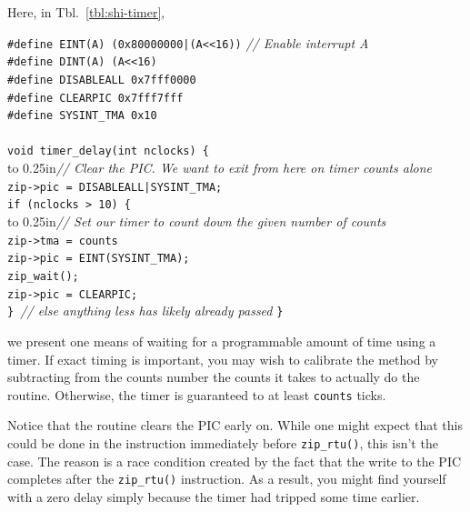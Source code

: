 \documentclass{gqtekspec}
\begin{document}
Here, in Tbl.~\ref{tbl:shi-timer},
\begin{table}\begin{center}
\begin{tabbing}
{\tt \#define EINT(A) (0x80000000|(A<<16))} \= {\em // Enable interrupt A}\\
{\tt \#define DINT(A) (A<<16)} \\
{\tt \#define DISABLEALL 0x7fff0000} \\
{\tt \#define CLEARPIC 0x7fff7fff} \\
{\tt \#define SYSINT\_TMA 0x10} \\
\\
{\tt void timer\_delay(int nclocks) \{} \\
\hbox to 0.25in{}\= {\em // Clear the PIC.  We want to exit from here on timer counts alone}\\
	\> {\tt zip->pic = DISABLEALL|SYSINT\_TMA;}\\
	\> {\tt if (nclocks > 10) \{}\\
	\> \hbox to 0.25in{}\= {\em // Set our timer to count down the given number of counts}\\
	\> \> {\tt zip->tma = counts} \\
	\> \> {\tt zip->pic = EINT(SYSINT\_TMA);} \\
	\> \> {\tt zip\_wait();} \\
	\> \> {\tt zip->pic = CLEARPIC;} \\
	\> {\tt \} }{\em // else anything less has likely already passed}
{\tt \}}\\
\end{tabbing}
\caption{Waiting on a timer}\label{tbl:shi-timer}
\end{center}\end{table}
we present one means of waiting for a programmable amount of time using a
timer.  If exact timing is important, you may wish to calibrate the method
by subtracting from the counts number the counts it takes to actually do the
routine.  Otherwise, the timer is guaranteed to at least {\tt counts}
ticks.

Notice that the routine clears the PIC early on.  While one might expect
that this could be done in the instruction immediately before {\tt zip\_rtu()},
this isn't the case.  The reason is a race condition created by the fact that
the write to the PIC completes after the {\tt zip\_rtu()} instruction.  As a
result, you might find yourself with a zero delay simply because the timer
had tripped some time earlier.
\end{document}
